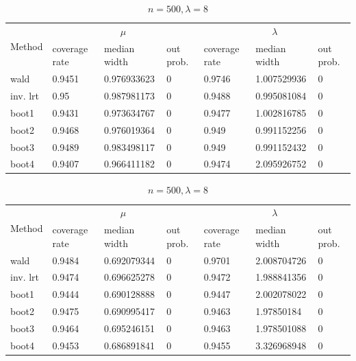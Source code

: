 \documentclass{article}
\begin{document}
\begin{table}
        \begin{subtable}[b]{\textwidth}
		\centering
		\begin{tabular}{l|lll|lll}
		\toprule
        \multirow{2}{*}{Method} & \multicolumn{3}{c|}{$\mu$}      & \multicolumn{3}{c}{$\lambda$}  \\ 
                           & coverage rate & median width & out prob. & coverage rate & median width & out prob. \\
                           \midrule
wald      & 0.9451	&0.976933623	&0  & 0.9746	&1.007529936 &	0\\
inv. lrt  & 0.95	&0.987981173	&0  & 0.9488	&0.995081084 &	0\\
boot1     & 0.9431	&0.973634767	&0  & 0.9477	&1.002816785 &	0\\
boot2     & 0.9468	&0.976019364	&0  & 0.949	    &0.991152256 &	0\\
boot3     & 0.9489	&0.983498117	&0  & 0.949	    &0.991152432 &	0\\
boot4     & 0.9407	&0.966411182	&0  & 0.9474	&2.095926752 &	0\\
       \bottomrule
       \end{tabular}
       \caption{$n = 500, \lambda = 4$}
       \label{500_4}
       \end{subtable}%

        \begin{subtable}[b]{\textwidth}
		\centering
		\begin{tabular}{l|lll|lll}
		\toprule
        \multirow{2}{*}{Method} & \multicolumn{3}{c|}{$\mu$}      & \multicolumn{3}{c}{$\lambda$}  \\ 
                           & coverage rate & median width & out prob. & coverage rate & median width & out prob. \\
                           \midrule
wald      & 0.9484	&0.692079344	&0 & 0.9701	&2.008704726	&0\\
inv. lrt  & 0.9474	&0.696625278	&0 & 0.9472	&1.988841356	&0\\
boot1     & 0.9444	&0.690128888	&0 & 0.9447	&2.002078022	&0\\
boot2     & 0.9475	&0.690995417	&0 & 0.9463	&1.97850184	&0\\
boot3     & 0.9464	&0.695246151	&0 & 0.9463	&1.978501088	&0\\
boot4     & 0.9453	&0.686891841	&0 & 0.9455	&3.326968948	&0\\
       \bottomrule
       \end{tabular}
       \caption{$n = 500, \lambda = 8$}
       \label{500_8}
       \end{subtable}%


\end{table}
\end{document}
